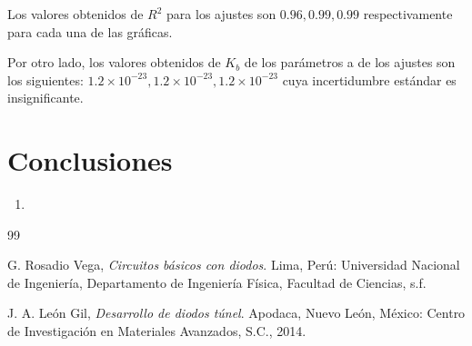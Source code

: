 \documentclass[twocolumn]{revtex4-2}
\begin{document}
Los valores obtenidos de $R^2$ para los ajustes son $0.96 ,0.99,0.99$ respectivamente para cada una de las gráficas.

Por otro lado, los valores obtenidos de $K_b $ de los parámetros a de los ajustes son los siguientes: $1.2 \times 10^{-23}, 1.2 \times 10^{-23},1.2 \times 10^{-23}$ cuya incertidumbre estándar es insignificante.

\section{Conclusiones}
{\setlength{\parskip}{10pt}
}
\begin{enumerate}

\item
\end{enumerate}
\begin{thebibliography}{99}

G. Rosadio Vega, \emph{Circuitos básicos con diodos}. Lima, Perú: Universidad Nacional de Ingeniería, Departamento de Ingeniería Física, Facultad de Ciencias, s.f.

J. A. León Gil, \emph{Desarrollo de diodos túnel}. Apodaca, Nuevo León, México: Centro de Investigación en Materiales Avanzados, S.C., 2014.
\end{thebibliography}

\appendix
\end{document}
